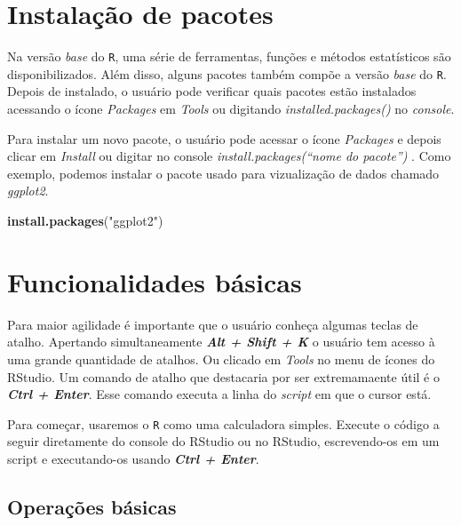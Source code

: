 \documentclass[
]{book}
\newenvironment{Shaded}{\begin{snugshade}}{\end{snugshade}}
\newcommand{\KeywordTok}[1]{\textcolor[rgb]{0.13,0.29,0.53}{\textbf{#1}}}
\newcommand{\NormalTok}[1]{#1}
\newcommand{\StringTok}[1]{\textcolor[rgb]{0.31,0.60,0.02}{#1}}
\begin{document}
\hypertarget{instalauxe7uxe3o-de-pacotes}{%
\section{Instalação de pacotes}\label{instalauxe7uxe3o-de-pacotes}}

Na versão \emph{base} do \texttt{R}, uma série de ferramentas, funções e métodos estatísticos são disponibilizados. Além disso, alguns pacotes também compõe a versão \emph{base} do \texttt{R}. Depois de instalado, o usuário pode verificar quais pacotes estão instalados acessando o ícone \emph{Packages} em \emph{Tools} ou digitando \emph{installed.packages()} no \emph{console}.

Para instalar um novo pacote, o usuário pode acessar o ícone \emph{Packages} e depois clicar em \emph{Install} ou digitar no console \emph{install.packages(``nome do pacote'')} . Como exemplo, podemos instalar o pacote usado para vizualização de dados chamado \emph{ggplot2}.

\begin{Shaded}
\begin{Highlighting}[]
\KeywordTok{install.packages}\NormalTok{(}\StringTok{"ggplot2"}\NormalTok{)}
\end{Highlighting}
\end{Shaded}

\hypertarget{funcionalidades-buxe1sicas}{%
\section{Funcionalidades básicas}\label{funcionalidades-buxe1sicas}}

Para maior agilidade é importante que o usuário conheça algumas teclas de atalho. Apertando simultaneamente \textbf{\emph{Alt + Shift + K}} o usuário tem acesso à uma grande quantidade de atalhos. Ou clicado em \emph{Tools} no menu de ícones do RStudio.
Um comando de atalho que destacaria por ser extremamaente útil é o \textbf{\emph{Ctrl + Enter}}. Esse comando executa a linha do \emph{script} em que o cursor está.

Para começar, usaremos o \texttt{R} como uma calculadora simples. Execute o código a seguir diretamente do console do RStudio ou no RStudio, escrevendo-os em um script e executando-os usando \textbf{\emph{Ctrl + Enter}}.

\hypertarget{operauxe7uxf5es-buxe1sicas}{%
\subsection{Operações básicas}\label{operauxe7uxf5es-buxe1sicas}}
\end{document}
